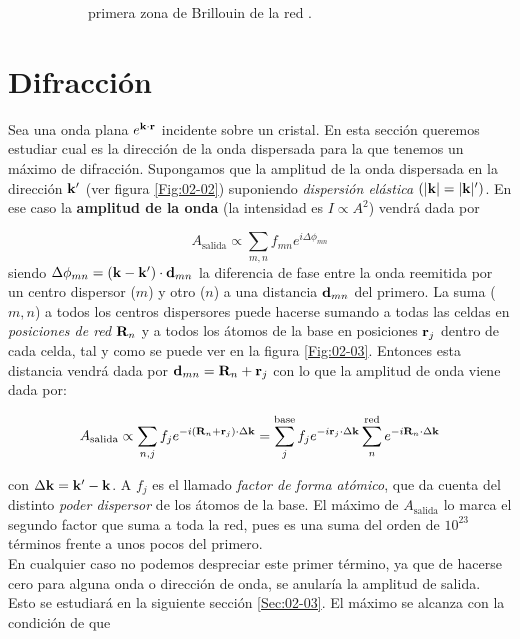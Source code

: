 \begin{figure}[h!]
\begin{subfigure}{0.45\linewidth}
	\caption{primera zona de Brillouin de la red \fcc.}
	\end{subfigure}
	\caption{}
\end{figure}

\section{Difracción}

Sea una onda plana $e^{\mathbf{k} \cdot \mathbf{r}}$ incidente sobre un cristal. En esta sección queremos estudiar cual es la dirección de la onda dispersada para la que tenemos un máximo de difracción. Supongamos que la amplitud de la onda dispersada en la dirección $\mathbf{k}'$ (ver figura \ref{Fig:02-02}) suponiendo \textit{dispersión elástica} $(|\mathbf{k}|=|\mathbf{k}|')$. En ese caso la \textbf{amplitud de la onda} (la intensidad es $I\propto A^2$) vendrá dada por 

\begin{equation}
    A_{\text{salida}} \propto \sum_{m,n} f_{mn} e^{i \Delta \phi_{mn}}
\end{equation}
siendo $\Delta \phi_{mn} = (\mathbf{k} - \mathbf{k}') \cdot \mathbf{d}_{mn}$ la diferencia de fase entre la onda reemitida por un centro dispersor ($m$) y otro ($n$) a una distancia $\mathbf{d}_{mn}$ del primero. La suma ($m,n$) a todos los centros dispersores puede hacerse sumando a todas las celdas en \textit{posiciones de red} $\mathbf{R}_n$ y a todos los átomos de la base en posiciones $\mathbf{r}_j$ dentro de cada celda, tal y como se puede ver en la figura \ref{Fig:02-03}. Entonces esta distancia vendrá dada por $\mathbf{d}_{mn}=\mathbf{R}_n+\mathbf{r}_j$ con lo que la amplitud de onda viene dada por:

\begin{mybox}
\begin{equation}
    A_{\text{salida}} \propto  \sum_{n,j} f_j e^{-i (\mathbf{R}_n + \mathbf{r}_j) \cdot \Delta \mathbf{k}} = \sum_j^{\text{base}} f_j e^{-i \mathbf{r}_j \cdot \Delta \mathbf{k}} \sum_{n}^{\text{red}} e^{-i\mathbf{R}_n \cdot \Delta \mathbf{k}} \label{Ec:02-02-02}
\end{equation}
\end{mybox}
con $\Delta \mathbf{k} = \mathbf{k}' - \mathbf{k}$. A $f_j$ es el llamado \textit{factor de forma atómico}, que da cuenta del distinto \textit{poder dispersor} de los átomos de la base. El máximo de $A_{\text{salida}}$ lo marca el segundo factor que suma a toda la red, pues es una suma del orden de $10^{23}$ términos frente a unos pocos del primero. \\

En cualquier caso no podemos despreciar este primer término, ya que de hacerse cero para alguna onda o dirección de onda, se anularía la amplitud de salida. Esto se estudiará en la siguiente sección \ref{Sec:02-03}. El máximo se alcanza con la condición de que

